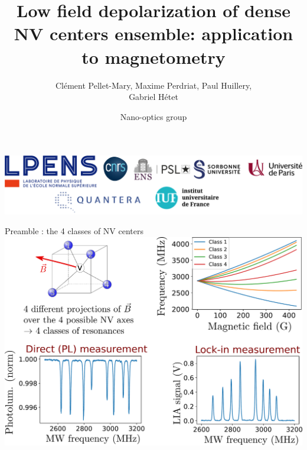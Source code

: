 \documentclass{beamer}
\title{Low field depolarization of dense NV centers ensemble: application to magnetometry}
\author{Clément Pellet-Mary, Maxime Perdriat, Paul Huillery,\\ Gabriel Hétet}
\date{Nano-optics group}
\begin{document}
\begin{frame}
\maketitle
\begin{center}
\includegraphics[width=\textwidth,height=0.3\textheight,keepaspectratio]{logos}
\end{center}
\end{frame}

\begin{frame}{Preamble : the 4 classes of NV centers}
\centering
\includegraphics[width=\textwidth,height=0.9\textheight,keepaspectratio]{slide ODMR 4 classes}
\end{frame}
\end{document}
